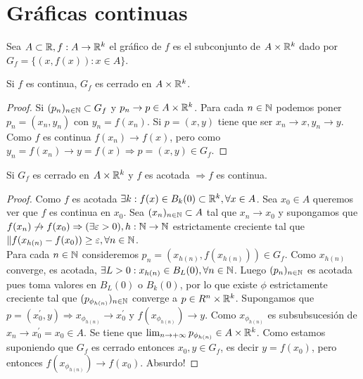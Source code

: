 \section{Gráficas continuas}

\begin{definition}
  Sea \(A \subset \mathbb{R}, f: A \to \mathbb{R}^k\) el gráfico de \(f\) es el subconjunto de \(A \times \mathbb{R}^k\) dado por \(G_f = \{ (x, f(x)) : x \in A \}\).
\end{definition}

\begin{prop}
  Si \(f\) es continua, \(G_f\) es cerrado en \(A \times \mathbb{R}^k\).
  \begin{proof}
    Si \((p_n)_{n \in \mathbb{N}} \subset G_f\) y \(p_n \to p \in A \times \mathbb{R}^k\). Para cada \(n \in \mathbb{N}\) podemos poner \(p_n = (x_n, y_n)\) con \(y_n = f(x_n)\). Si \(p = (x, y)\) tiene que ser \(x_n \to x, y_n \to y\). Como \(f\) es continua \(f(x_n) \to f(x)\), pero como \(y_n = f(x_n) \to y = f(x) \Rightarrow p = (x, y) \in G_f\).
  \end{proof}
\end{prop}

\begin{prop}
  Si \(G_f\) es cerrado en \(A \times \mathbb{R}^k\) y \(f\) es acotada \(\Rightarrow f\) es continua.
  \begin{proof}
    Como \(f\) es acotada \(\exists k : f(x) \in B_k(0) \subset \mathbb{R}^k, \forall x \in A\). Sea \(x_0 \in A\) queremos ver que \(f\) es continua en \(x_0\). Sea \((x_n)_{n \in \mathbb{N}} \subset A\) tal que \(x_n \to x_0\) y supongamos que \(f(x_n) \not \to f(x_0) \Rightarrow (\exists \varepsilon > 0), h: \mathbb{N} \to \mathbb{N}\) estrictamente creciente tal que \(\|f(x_{h(n)} - f(x_0)) \geq \varepsilon, \forall n \in \mathbb{N}\). \\
    Para cada \(n \in \mathbb{N}\) consideremos \(p_n = (x_{h(n)}, f(x_{h(n)})) \in G_f\). Como \(x_{h(n)}\) converge, es acotada, \(\exists L > 0 : x_{h(n)} \in B_L(0), \forall n \in \mathbb{N}\). Luego \((p_n)_{n \in \mathbb{N}}\) es acotada pues toma valores en \(B_L(0)\) o \(B_k(0)\), por lo que existe \(\phi\) estrictamente creciente tal que \((p_{\phi_{h(n)}})_{n \in \mathbb{N}}\) converge a \(p \in R^n \times \mathbb{R}^k\).
    Supongamos que \(p = (x_0^{\prime}, y) \Rightarrow x_{\phi_{h(n)}} \to x_0^{\prime}\) y \(f(x_{\phi_{h(n)}}) \to y\). Como \(x_{\phi_{h(n)}}\) es subsubsucesión de \(x_n \to x_0^{\prime} = x_0 \in A\). Se tiene que \(\lim_{n \to +\infty} p_{\phi_{h(n)}} \in A \times \mathbb{R}^k\). Como estamos suponiendo que \(G_f\) es cerrado entonces \(x_0, y \in G_f\), es decir \(y = f(x_0)\), pero entonces \(f(x_{\phi_{h(n)}}) \to f(x_0)\). Absurdo!
  \end{proof}
\end{prop}

